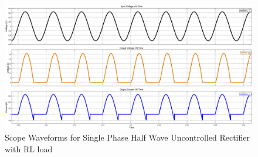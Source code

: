 \begin{figure}[h]
    \centering
    \includegraphics[width=1\textwidth]{images/experiment-1/circuit-scope-experiment-02.png}
    \caption{Scope Waveforms for Single Phase Half Wave Uncontrolled Rectifier with RL load}
    \label{Fig_waveform_single-phase-half-wave-uncontrolled-rectifier-with-RL-load}
\end{figure}

\pagebreak
